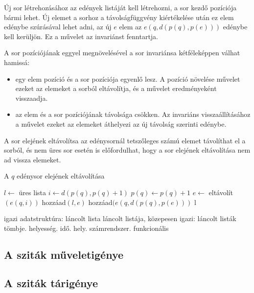 Új sor létrehozásához az edények listáját kell létrehozni, a sor kezdő pozíciója bármi lehet.
Új elemet a sorhoz a távolságfüggvény kiértékelése után ez elem edénybe szúrásával lehet adni,
az új $e$ elem az $e(q, d(p(q), p(e)))$ edénybe kell kerüljön. Ez a művelet az invariánst fenntartja.

A sor pozíciójának eggyel megnövelésével a sor invariánsa kétféleképpen válhat hamissá:
\begin{itemize}
\item egy elem pozíció és a sor pozíciója egyenlő lesz. A pozíció növelése művelet ezeket az elemeket a sorból eltávolítja, és a művelet eredményeként visszaadja.
\item az elem és a sor pozíciójának távolsága csökken. Az invariáns visszaállításához a művelet ezeket az elemeket áthelyezi az új távolság szerinti edénybe.
\end{itemize}
A sor elejének eltávolítsa az edénysornál tetszőleges számú elemet távolíthat el a sorból, és nem üres sor esetén is előfordulhat, hogy a sor elejének eltávolítása nem ad vissza elemeket.

\begin{algorithm}
\caption{A $q$ edénysor elejének eltávolítása}
\label{alg:buckets-remove-min}
\begin{algorithmic}[1]
	\State $l \gets$ üres lista
	\State $i \gets d(p(q), p(q)+1)$
	\State $p(q) \gets p(q)+1$
		\State $e \gets$ eltávolít$(e(q, i))$
			\State hozzáad$(l, e)$
		\Else
			\State hozzáad$(e(q, d(p(q), p(e)))$
		\EndIf
	\EndWhile
	\State \Return l
\EndFunction
\end{algorithmic}
\end{algorithm}

{\color{red}igazi adatstruktúra: láncolt lista láncolt listája, közepesen igazi: láncolt listák tömbje. helyesség. idő. hely. számrendszer. funkcionális}

\subsection{A sziták műveletigénye}

\subsection{A sziták tárigénye}

